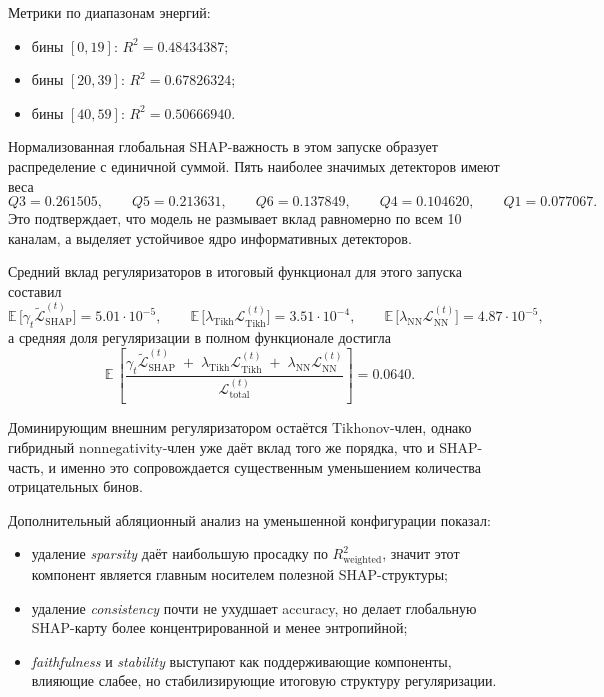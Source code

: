 \documentclass[11pt]{article}
\begin{document}
Метрики по диапазонам энергий:
\begin{itemize}
    \item бины $[0,19]$: $R^2 = 0.48434387$;
    \item бины $[20,39]$: $R^2 = 0.67826324$;
    \item бины $[40,59]$: $R^2 = 0.50666940$.
\end{itemize}

Нормализованная глобальная SHAP-важность в этом запуске образует распределение с единичной суммой.
Пять наиболее значимых детекторов имеют веса
\begin{equation}
Q3 = 0.261505,\qquad
Q5 = 0.213631,\qquad
Q6 = 0.137849,\qquad
Q4 = 0.104620,\qquad
Q1 = 0.077067.
\end{equation}
Это подтверждает, что модель не размывает вклад равномерно по всем 10 каналам, а выделяет устойчивое ядро информативных детекторов.

Средний вклад регуляризаторов в итоговый функционал для этого запуска составил
\begin{equation}
\mathbb{E}\,\bigl[\gamma_t \widetilde{\mathcal{L}}_{\mathrm{SHAP}}^{(t)}\bigr] = 5.01 \cdot 10^{-5},
\qquad
\mathbb{E}\,\bigl[\lambda_{\mathrm{Tikh}}\mathcal{L}_{\mathrm{Tikh}}^{(t)}\bigr] = 3.51 \cdot 10^{-4},
\qquad
\mathbb{E}\,\bigl[\lambda_{\mathrm{NN}}\mathcal{L}_{\mathrm{NN}}^{(t)}\bigr] = 4.87 \cdot 10^{-5},
\end{equation}
а средняя доля регуляризации в полном функционале достигла
\begin{equation}
\mathbb{E}\,\left[
\frac{
\gamma_t \widetilde{\mathcal{L}}_{\mathrm{SHAP}}^{(t)}
\;+\;
\lambda_{\mathrm{Tikh}}\mathcal{L}_{\mathrm{Tikh}}^{(t)}
\;+\;
\lambda_{\mathrm{NN}}\mathcal{L}_{\mathrm{NN}}^{(t)}
}{
\mathcal{L}_{\mathrm{total}}^{(t)}
}
\right]
= 0.0640.
\end{equation}

Доминирующим внешним регуляризатором остаётся Tikhonov-член, однако гибридный nonnegativity-член уже даёт вклад того же порядка, что и SHAP-часть, и именно это сопровождается существенным уменьшением количества отрицательных бинов.

Дополнительный абляционный анализ на уменьшенной конфигурации показал:
\begin{itemize}
    \item удаление \textit{sparsity} даёт наибольшую просадку по $R^2_{\mathrm{weighted}}$, значит этот компонент является главным носителем полезной SHAP-структуры;
    \item удаление \textit{consistency} почти не ухудшает accuracy, но делает глобальную SHAP-карту более концентрированной и менее энтропийной;
    \item \textit{faithfulness} и \textit{stability} выступают как поддерживающие компоненты, влияющие слабее, но стабилизирующие итоговую структуру регуляризации.
\end{itemize}
\end{document}
